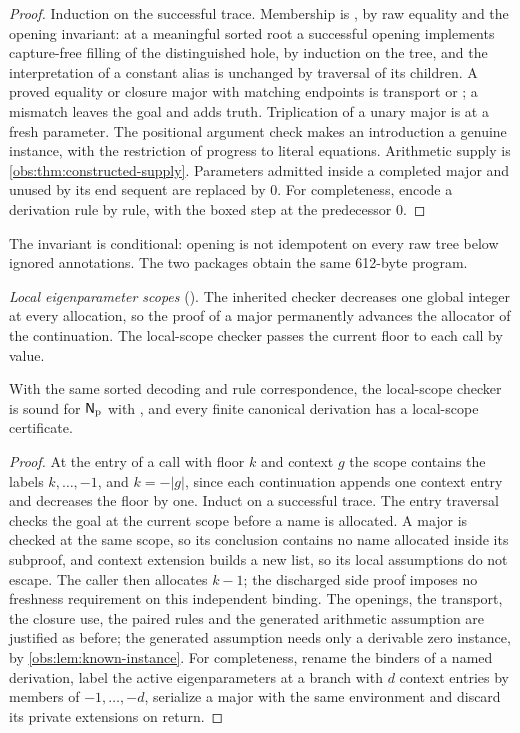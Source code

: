 \begin{proof}
Induction on the successful trace. Membership is , by raw
equality and the opening invariant: at a meaningful sorted root a successful
opening implements capture-free filling of the distinguished hole, by
induction on the tree, and the interpretation of a constant alias is unchanged
by traversal of its children. A proved equality or closure major with matching
endpoints is transport or ; a mismatch leaves the goal and adds
truth. Triplication of a unary major is  at a fresh parameter. The
positional argument check makes an introduction a genuine instance, with the
restriction of progress to literal equations. Arithmetic supply is
\cref{obs:thm:constructed-supply}. Parameters admitted inside a completed
major and unused by its end sequent are replaced by $0$. For completeness,
encode a derivation rule by rule, with the boxed step at the predecessor $0$.
\end{proof}

The invariant is conditional: opening is not idempotent on every raw tree
below ignored annotations. The two packages obtain the same 612-byte program.

\emph{Local eigenparameter scopes} (). The inherited checker
decreases one global integer at every allocation, so the proof of a major
permanently advances the allocator of the continuation. The local-scope checker
passes the current floor to each call by value.

\begin{theorem}
\label{obs:thm:local-scope}
With the same sorted decoding and rule correspondence, the local-scope checker
is sound for $\mathsf{N}_{\mathrm{p}}$ with , and every finite
canonical derivation has a local-scope certificate.
\end{theorem}

\begin{proof}
At the entry of a call with floor $k$ and context $g$ the scope contains the
labels $k,\dots,-1$, and $k=-|g|$, since each continuation appends one context
entry and decreases the floor by one. Induct on a successful trace. The entry
traversal checks the goal at the current scope before a name is allocated. A
major is checked at the same scope, so its conclusion contains no name
allocated inside its subproof, and context extension builds a new list, so its
local assumptions do not escape. The caller then allocates $k-1$; the
discharged side proof imposes no freshness requirement on this independent
binding. The openings, the transport, the closure use, the paired rules and the
generated arithmetic assumption are justified as before; the generated
assumption needs only a derivable zero instance, by
\cref{obs:lem:known-instance}. For completeness, rename the binders of a named
derivation, label the active eigenparameters at a branch with $d$ context
entries by members of $-1,\dots,-d$, serialize a major with the same
environment and discard its private extensions on return.
\end{proof}

